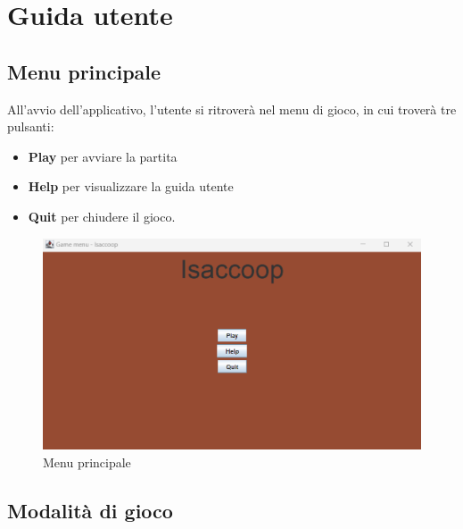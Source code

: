 \documentclass[a4paper,12pt]{report}
\begin{document}
\appendix
\chapter{Guida utente}

\section*{Menu principale}
All'avvio dell'applicativo, l'utente si ritroverà nel menu di gioco, in cui troverà tre pulsanti:
\begin{itemize}
    \item \textbf{Play} per avviare la partita
    \item \textbf{Help} per visualizzare la guida utente
    \item \textbf{Quit} per chiudere il gioco.
\end{itemize}
\begin{figure}[h]
\centering{}
\includegraphics[width=\textwidth]{img/mainMenu.png}
\caption{Menu principale}
\label{img/standardRoom.png}
\end{figure}

\section*{Modalità di gioco}
\end{document}
